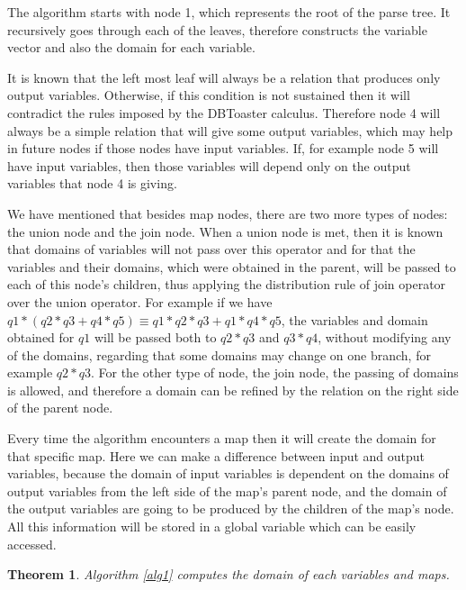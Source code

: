 \documentclass[12pt]{article}
\newtheorem{theorem}{Theorem}
\begin{document}
	The algorithm starts with node 1, which represents the root of the parse tree. It recursively goes through each of the leaves, therefore constructs the variable vector and also the domain for each variable.
	
	It is known that the left most leaf will always be a relation that produces only output variables. Otherwise, if this condition is not sustained then it will contradict the rules imposed by the DBToaster calculus. Therefore node 4 will always be a simple relation that will give some output variables, which may help in future nodes if those nodes have input variables. If, for example node 5 will have input variables, then those variables will depend only on the output variables that node 4 is giving.
	
	We have mentioned that besides map nodes, there are two more types of nodes: the union node and the join node. When a union node is met, then it is known that domains of variables will not pass over this operator and for that the variables and their domains, which were obtained in the parent, will be passed to each of this node's children, thus applying the distribution rule of join operator over the union operator. For example if we have $ q1 * (q2 * q3 + q4 * q5) \equiv q1 * q2 * q3 + q1 * q4 * q5$, the variables and domain obtained for $q1$ will be passed both to $q2*q3$ and $q3*q4$, without modifying any of the domains, regarding that some domains may change on one branch, for example $q2*q3$. For the other type of node, the join node, the passing of domains is allowed, and therefore a domain can be refined by the relation on the right side of the parent node.
	
	Every time the algorithm encounters a map then it will create the domain for that specific map. Here we can make a difference between input and output variables, because the domain of input variables is dependent on the domains of output variables from the left side of the map's parent node, and the domain of the output variables are going to be produced by the children of the map's node. All this information will be stored in a global variable which can be easily accessed.
\begin{theorem}
Algorithm \ref{alg1} computes the domain of each variables and maps.
\end{theorem}
\end{document}
